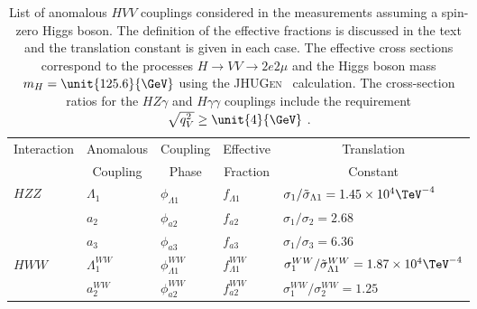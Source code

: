 \begin{table}
\centering
\caption[List of anomalous $HVV$ couplings considered in the measurements assuming a spin-zero Higgs boson. The definition of the effective fractions is discussed in the text and the translation constant is given in each case. The effective cross sections correspond to the processes $H \to VV \to 2e2\mu$ and the Higgs boson mass $m_{H}=\unit{125.6}{\GeV}$ using the \textsc{JHUGen} calculation. The cross-section ratios for the $HZ\gamma$ and $H\gamma\gamma$ couplings include the requirement $\sqrt{q^2_{V}} \ge \unit{4}{\GeV}$.]{
List of anomalous $HVV$ couplings considered in the measurements assuming a spin-zero Higgs boson. The definition of the effective fractions is discussed in the text and the translation constant is given in each case. The effective cross sections correspond to the processes $H \to VV \to 2e2\mu$ and the Higgs boson mass $m_{H}=\unit{125.6}{\GeV}$ using the \textsc{JHUGen}~\cite{Gao:2010qx,Bolognesi:2012mm,Anderson:2013afp} calculation. The cross-section ratios for the $HZ\gamma$ and $H\gamma\gamma$ couplings include the requirement $\sqrt{q^2_{V}} \ge \unit{4}{\GeV}$ \cite{Khachatryan:2014kca}.
\label{tab:xsec_ratio}}
\begin{tabular}{lllll}
\multicolumn{1}{c}{Interaction} & \multicolumn{1}{c}{Anomalous}& \multicolumn{1}{c}{Coupling} & \multicolumn{1}{c}{Effective} & \multicolumn{1}{c}{Translation} \\
 & \multicolumn{1}{c}{Coupling}    & \multicolumn{1}{c}{Phase} & \multicolumn{1}{c}{Fraction}   & \multicolumn{1}{c}{Constant} \\
\hline \hline
\multirow{3}{*}{$HZZ$}& $\Lambda_{1}$ & $\phi_{\Lambda1}$ & $f_{\Lambda1}$ & $\sigma_{1}/{\tilde\sigma_{\Lambda1}}=1.45\times 10^{4}\TeV^{-4}$ \\
& $a_2$ & $\phi_{a2}$ & $f_{a2}$ & $\sigma_{1}/\sigma_{2}=2.68$ \\
& $a_3$ & $\phi_{a3}$ & $f_{a3}$ & $\sigma_{1}/\sigma_{3}=6.36$ \\
\hline
\multirow{3}{*}{$HWW$}& $\Lambda_{1}^{WW}$ & $\phi_{\Lambda1}^{WW}$ & $f_{\Lambda1}^{WW}$ & $\sigma_{1}^{WW}/{\tilde\sigma_{\Lambda1}^{WW}}=1.87\times 10^{4}\TeV^{-4}$ \\
 & $a_2^{WW}$ & $\phi_{a2}^{WW}$ & $f_{a2}^{WW}$ & $\sigma^{WW}_{1}/\sigma^{WW}_{2}=1.25$ \\


\end{tabular}
\end{table}
